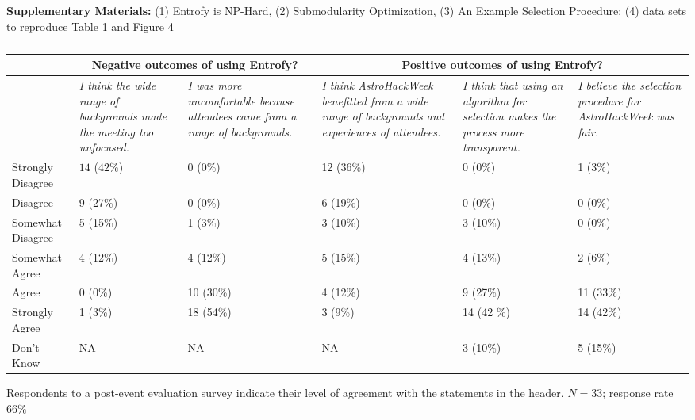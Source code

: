 \documentclass[12pt]{article}
\begin{document}
\noindent \textbf{Supplementary Materials:} (1) Entrofy is NP-Hard, (2) Submodularity Optimization, (3) An Example Selection Procedure; (4) data sets to reproduce Table 1 and Figure 4


\begin{table}
\renewcommand{\arraystretch}{1.3}
\footnotesize
\caption{}
\begin{threeparttable} 
\begin{tabularx}{22cm}{p{2cm}p{3.5cm}p{3.5cm}p{0.5cm}p{3.5cm}p{3.5cm}p{3.5cm}}
\toprule
 & \multicolumn{3}{c}{Negative outcomes of using Entrofy?} & \multicolumn{3}{c}{Positive outcomes of using Entrofy?} \\
 \midrule
 & \textit{I think the wide range of backgrounds made the meeting too unfocused.} & \textit{I was more uncomfortable because attendees came from a range of backgrounds.} && \textit{I think AstroHackWeek benefitted from a wide range of backgrounds and experiences of attendees.} & \textit{I think that using an algorithm for selection makes the process more transparent.} & \textit{I believe the selection procedure for AstroHackWeek was fair.} \\
 \midrule
 Strongly Disagree & $14$ ($42\%$) & 0 (0\%) && 12 (36\%) & 0 (0\%) & 1 (3\%) \\
 Disagree & 9 (27\%) & 0 (0\%) && 6 (19\%) & 0 (0\%) & 0 (0\%) \\
 Somewhat Disagree & 5 (15\%) & 1 (3\%) && 3 (10\%) & 3 (10\%) & 0 (0\%) \\
 Somewhat Agree & 4 (12\%) & 4 (12\%) && 5 (15\%) & 4 (13\%) & 2 (6\%) \\
 Agree & 0 (0\%) & 10 (30\%) && 4 (12\%) & 9 (27\%) & 11 (33\%) \\
 Strongly Agree & 1 (3\%) & 18 (54\%) && 3 (9\%) & 14 (42 \%) & 14 (42\%) \\
 Don't Know & NA & NA && NA & 3 (10\%) & 5 (15\%) \\
\bottomrule
\end{tabularx}
   \begin{tablenotes}
      \item{Respondents to a post-event evaluation survey indicate their level of agreement with the statements in the header. $N=33$; response rate $66\%$}
\end{tablenotes}

\end{threeparttable}
\label{tab:priors}
\end{table}
\end{document}
